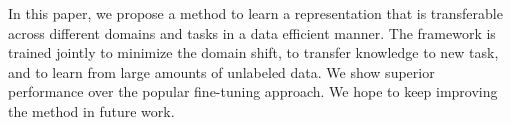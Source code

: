In this paper, we propose a method to learn a representation that is transferable across different domains and tasks in a data efficient manner. The framework is trained jointly to minimize the domain shift, to transfer knowledge to new task, and to learn from large amounts of unlabeled data. We show superior performance over the popular fine-tuning approach. We hope to keep improving the method in future work.